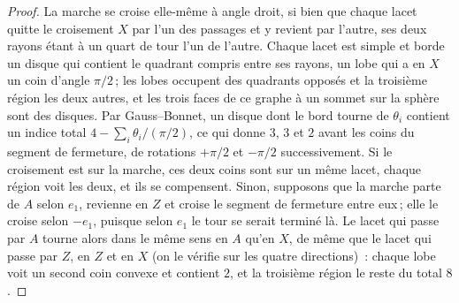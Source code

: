\documentclass[11pt,a4paper]{article}
\begin{document}
\begin{proof}
La marche se croise elle-même à angle droit, si bien que chaque lacet quitte
le croisement $X$ par l'un des passages et y revient par l'autre, ses deux
rayons étant à un quart de tour l'un de l'autre. Chaque lacet est simple et
borde un disque qui contient le quadrant compris entre ses rayons, un lobe qui
a en $X$ un coin d'angle $\pi/2$\,; les lobes occupent des quadrants opposés
et la troisième région les deux autres, et les trois faces de ce graphe à un
sommet sur la sphère sont des disques. Par Gauss--Bonnet, un disque dont le
bord tourne de $\theta_i$ contient un indice total $4 - \sum_i
\theta_i/(\pi/2)$, ce qui donne $3$, $3$ et $2$ avant les coins du segment de
fermeture, de rotations $+\pi/2$ et $-\pi/2$ successivement. Si le croisement
est sur la marche, ces deux coins sont sur un même lacet, chaque région voit
les deux, et ils se compensent. Sinon, supposons que la marche parte de $A$
selon $e_1$, revienne en $Z$ et croise le segment de fermeture entre eux\,;
elle le croise selon $-e_1$, puisque selon $e_1$ le tour se serait terminé là.
Le lacet qui passe par $A$ tourne alors dans le même sens en $A$ qu'en $X$, de
même que le lacet qui passe par $Z$, en $Z$ et en $X$ (on le vérifie sur les
quatre directions)~: chaque lobe voit un second coin convexe et contient $2$,
et la troisième région le reste du total $8$.
\end{proof}
\end{document}
